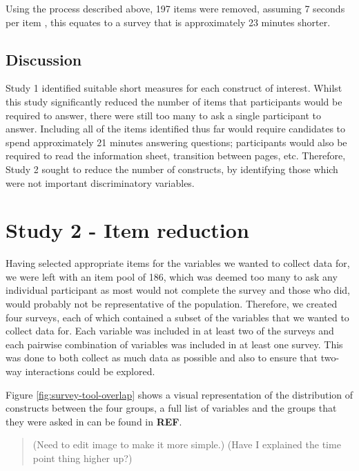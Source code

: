 \documentclass[a4paper,]{book}
\begin{document}
Using the process described above, 197 items were removed, assuming 7 seconds per item \citep{Qualtrics}, this equates to a survey that is approximately 23 minutes shorter.

\hypertarget{discussion-3}{%
\subsection{Discussion}\label{discussion-3}}

Study 1 identified suitable short measures for each construct of interest. Whilst this study significantly reduced the number of items that participants would be required to answer, there were still too many to ask a single participant to answer. Including all of the items identified thus far would require candidates to spend approximately 21 minutes answering questions; participants would also be required to read the information sheet, transition between pages, etc. Therefore, Study 2 sought to reduce the number of constructs, by identifying those which were not important discriminatory variables.

\hypertarget{study-2---item-reduction}{%
\section{Study 2 - Item reduction}\label{study-2---item-reduction}}

Having selected appropriate items for the variables we wanted to collect data for, we were left with an item pool of 186, which was deemed too many to ask any individual participant as most would not complete the survey and those who did, would probably not be representative of the population. Therefore, we created four surveys, each of which contained a subset of the variables that we wanted to collect data for. Each variable was included in at least two of the surveys and each pairwise combination of variables was included in at least one survey. This was done to both collect as much data as possible and also to ensure that two-way interactions could be explored.

Figure \ref{fig:survey-tool-overlap} shows a visual representation of the distribution of constructs between the four groups, a full list of variables and the groups that they were asked in can be found in \textbf{REF}.

\begin{quote}
(Need to edit image to make it more simple.)
(Have I explained the time point thing higher up?)
\end{quote}
\end{document}
